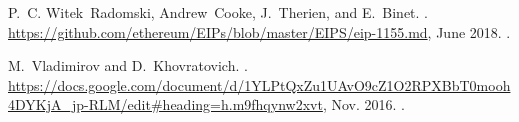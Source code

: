 \begin{thebibliography}{10}
P.~C. Witek~Radomski, Andrew~Cooke, J.~Therien, and E.~Binet.
.
\newblock \url{https://github.com/ethereum/EIPs/blob/master/EIPS/eip-1155.md},
  June 2018.
.

M.~Vladimirov and D.~Khovratovich.
.
\newblock
\url{https://docs.google.com/document/d/1YLPtQxZu1UAvO9cZ1O2RPXBbT0mooh4DYKjA_jp-RLM/edit#heading=h.m9fhqynw2xvt},
Nov. 2016.
.


\end{thebibliography}
